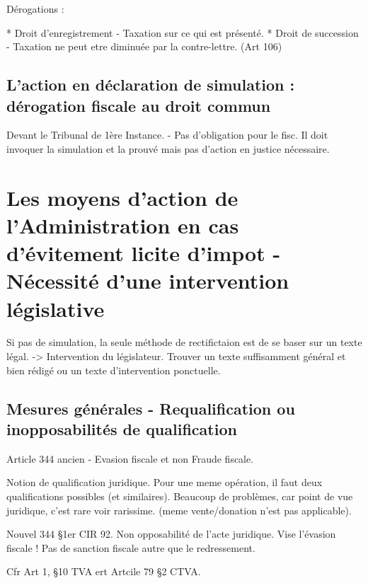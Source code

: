 \documentclass{book}
\begin{document}
Dérogations :

* Droit d'enregistrement - Taxation sur ce qui est présenté.
* Droit de succession - Taxation ne peut etre diminuée par la contre-lettre. (Art 106)

\subsection{L'action en déclaration de simulation : dérogation fiscale au droit commun}

Devant le Tribunal de 1ère Instance. - Pas d'obligation pour le fisc. Il doit invoquer la simulation et la prouvé mais pas d'action en justice nécessaire.

\section{Les moyens d'action de l'Administration en cas d'évitement licite d'impot - Nécessité d'une intervention législative}

Si pas de simulation, la seule méthode de rectifictaion est de se baser sur un texte légal. -> Intervention du législateur. Trouver un texte suffisamment général et bien rédigé ou un texte d'intervention ponctuelle.

\subsection{Mesures générales - Requalification ou inopposabilités de qualification}

Article 344 ancien - Evasion fiscale et non Fraude fiscale.

Notion de qualification juridique. Pour une meme opération, il faut deux qualifications possibles (et similaires). Beaucoup de problèmes, car point de vue juridique, c'est rare voir rarissime. (meme vente/donation n'est pas applicable).

Nouvel 344 §1er CIR 92. Non opposabilité de l'acte juridique. Vise l'évasion fiscale ! Pas de sanction fiscale autre que le redressement.

Cfr Art 1, §10 TVA ert Artcile 79 §2 CTVA.







   
\nocite{*}

\end{document}
